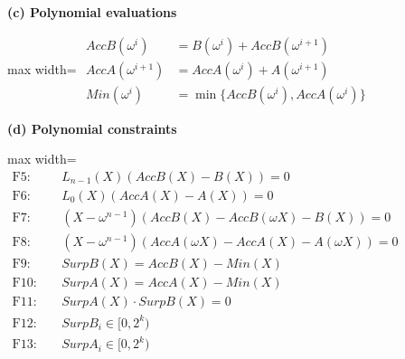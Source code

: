 \begin{minipage}[t]{0.48\linewidth}
\textbf{(c) Polynomial evaluations}\par\smallskip
\begin{adjustbox}{max width=\linewidth}
$\displaystyle
\begin{aligned}
AccB(\omega^i) &= B(\omega^i)+AccB(\omega^{i+1})\\
AccA(\omega^{i+1}) &= AccA(\omega^i)+A(\omega^{i+1})\\
Min(\omega^i) &= \min\{AccB(\omega^i),AccA(\omega^i)\}
\end{aligned}
$
\end{adjustbox}
\end{minipage}
\hfill
\begin{minipage}[t]{0.48\linewidth}
\textbf{(d) Polynomial constraints}\par\smallskip
\begin{adjustbox}{max width=\linewidth}
$\displaystyle
\begin{aligned}
\mathrm{F5:}\quad &L_{n-1}(X)(AccB(X)-B(X))=0\\
\mathrm{F6:}\quad &L_0(X)(AccA(X)-A(X))=0\\
\mathrm{F7:}\quad &(X-\omega^{n-1})(AccB(X)-AccB(\omega X)-B(X))=0\\
\mathrm{F8:}\quad &(X-\omega^{n-1})(AccA(\omega X)-AccA(X)-A(\omega X))=0\\
\mathrm{F9:}\quad &SurpB(X)=AccB(X)-Min(X)\\
\mathrm{F10:}\quad &SurpA(X)=AccA(X)-Min(X)\\
\mathrm{F11:}\quad &SurpA(X)\cdot SurpB(X)=0\\
\mathrm{F12:}\quad &SurpB_i\in[0,2^k)\\
\mathrm{F13:}\quad &SurpA_i\in[0,2^k)
\end{aligned}
$
\end{adjustbox}
\end{minipage}

